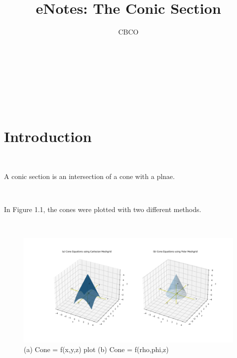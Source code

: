 \documentclass[10pt,a4paper,leqno]{article}
\author{CBCO}
\title{eNotes: The Conic Section}
\date{}
\begin{document}
\maketitle

\noindent {} %
\renewcommand{\theequation}{\thesection.\arabic{equation}}  
 \par \ \par\noindent {}
 \par \ \par\noindent \begin{CJK*}{UTF8}{gbsn}
 \par \ \par\noindent \section{Introduction }
 \par \ \par\noindent A conic section is an intersection of a cone with a plnae.
 \par \ \par\noindent In Figure 1.1, the cones were plotted with two different methods.
 \par \ \par\begin{figure}[H]
\centering\includegraphics[width=1\linewidth,height=0.25\textheight]{Data/fgr01.png}
\caption{(a) Cone = f(x,y,z) plot (b) Cone = f(rho,phi,z) }
\label{fig:Data/fgr01.png}
\end{figure}


\end{CJK*}
\end{document}
